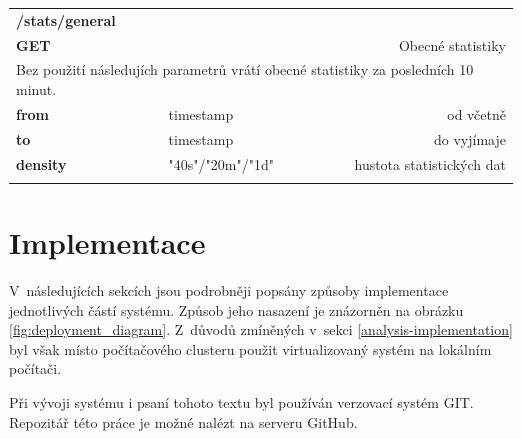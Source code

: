 \documentclass[thesis=B,czech]{FITthesis}[2012/06/26]
\begin{document}
\begin{table}[h]
\begin{tabular}{llllr}
\rowcolor[HTML]{EFEFEF}
\large \textbf{/stats/general}        &         &                 &        & \multicolumn{1}{l}{}                \\
\rowcolor[HTML]{EFEFEF}
\textbf{GET}          &         &                 &        & Obecné statistiky                        \\
\multicolumn{5}{l}{\parbox[t]{12.8cm}{Bez použití následujích parametrů vrátí obecné statistiky za posledních 10 minut.  }  } \\
\textbf{from}         &         & timestamp       &        & od včetně                           \\
\textbf{to}           &         & timestamp       &        & do vyjímaje                         \\
\textbf{density}        &         & "40s"/"20m"/"1d"         &        & hustota statistických dat   \\
 & & & & \\
\end{tabular}
\end{table}



\chapter{Implementace}
\label{implementace}
V~následujících sekcích jsou podrobněji popsány způsoby implementace jednotlivých částí systému. Způsob jeho nasazení je znázorněn na obrázku \ref{fig:deployment_diagram}. Z~důvodů zmíněných v~sekci \ref{analysis-implementation} byl však místo počítačového clusteru použit virtualizovaný systém na lokálním počítači. 

Při vývoji systému i psaní tohoto textu byl používán verzovací systém GIT. Repozitář této práce je možné nalézt na serveru GitHub\cite{github}. 
\end{document}
